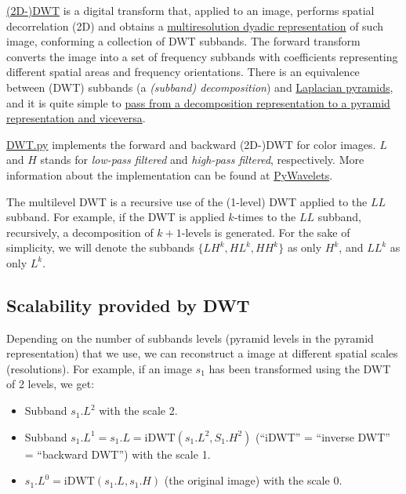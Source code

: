 \href{https://en.wikipedia.org/wiki/Discrete_wavelet_transform}{(2D-)DWT}
is a digital transform that, applied to an image, performs spatial
decorrelation (2D) and obtains a
\href{https://vicente-gonzalez-ruiz.github.io/image_transformations_for_coding/index.html#x1-3500024}{multiresolution
  dyadic representation} of such image, conforming a collection of DWT
subbands. The forward transform converts the image into a set of
frequency subbands with coefficients representing different spatial
areas and frequency orientations. There is an equivalence between
(DWT) subbands (a \emph{(subband) decomposition}) and
\href{http://fourier.eng.hmc.edu/e161/lectures/canny/node3.html}{Laplacian
  pyramids}, and it is quite simple to
\href{https://vicente-gonzalez-ruiz.github.io/pyramids-and-wavelets/}{pass
  from a decomposition representation to a pyramid representation and
  viceversa}.

\href{https://github.com/vicente-gonzalez-ruiz/MCDWT/blob/master/src/DWT.py}{DWT.py}
implements the forward and backward (2D-)DWT for color images. $L$ and
$H$ stands for \emph{low-pass filtered} and \emph{high-pass filtered},
respectively.  More information about the implementation can be found at
\href{https://pywavelets.readthedocs.io/en/latest/index.html}{PyWavelets}.




The multilevel DWT is a recursive use of the (1-level) DWT applied to
the $LL$ subband. For example, if the DWT is applied $k$-times to the
$LL$ subband, recursively, a decomposition of $k+1$-levels is generated. For
the sake of simplicity, we will denote the subbands $\{LH^k, HL^k,
HH^k\}$ as only $H^k$, and $LL^k$ as only $L^k$.

\subsection{Scalability provided by DWT}
Depending on the number of subbands levels (pyramid levels in the
pyramid representation) that we use, we can reconstruct a image at
different spatial scales (resolutions). For example, if an image $s_1$ has been transformed using the DWT of 2 levels, we get:
\begin{itemize}
\item Subband $s_1.L^2$ with the scale 2.
\item Subband $s_1.L^1=s_1.L=\text{iDWT}(s_1.L^2, S_1.H^2)$ (``iDWT'' =
  ``inverse DWT'' = ``backward DWT'') with the scale 1.
\item $s_1.L^0=\text{iDWT}(s_1.L, s_1.H)$ (the original image) with the scale 0.
\end{itemize}

